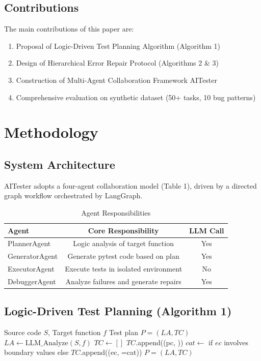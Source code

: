 \documentclass[10pt, conference]{ieeeconf}
\begin{document}
\subsection{Contributions}
The main contributions of this paper are:
\begin{enumerate}
    \item Proposal of Logic-Driven Test Planning Algorithm (Algorithm 1)
    \item Design of Hierarchical Error Repair Protocol (Algorithms 2 \& 3)
    \item Construction of Multi-Agent Collaboration Framework AITester
    \item Comprehensive evaluation on synthetic dataset (50+ tasks, 10 bug patterns)
\end{enumerate}

\section{Methodology}

\subsection{System Architecture}
AITester adopts a four-agent collaboration model (Table 1), driven by a directed graph workflow orchestrated by LangGraph.

\begin{table}[h]
\centering
\caption{Agent Responsibilities}
\begin{tabular}{lcc}
\hline
\textbf{Agent} & \textbf{Core Responsibility} & \textbf{LLM Call} \\
\hline
PlannerAgent & Logic analysis of target function & Yes \\
GeneratorAgent & Generate pytest code based on plan & Yes \\
ExecutorAgent & Execute tests in isolated environment & No \\
DebuggerAgent & Analyze failures and generate repairs & Yes \\
\hline
\end{tabular}
\end{table}

\subsection{Logic-Driven Test Planning (Algorithm 1)}

\begin{algorithm}[h]
\caption{Logic-Driven Test Planning}
\begin{algorithmic}[1]
\REQUIRE Source code $S$, Target function $f$
\ENSURE Test plan $P = (LA, TC)$
\STATE $LA \leftarrow \text{LLM\_Analyze}(S, f)$
\STATE $TC \leftarrow []$
    \STATE $TC$.append((pc, ))
\ENDFOR
{}
    \STATE $cat \leftarrow $ if $ec$ involves boundary values else 
    \STATE $TC$.append((ec, =cat))
\ENDFOR
\RETURN $P = (LA, TC)$
\end{algorithmic}
\end{algorithm}
\end{document}
